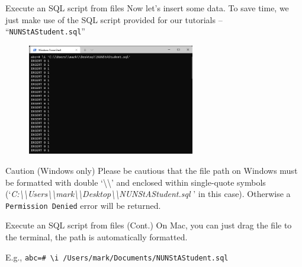 \begin{frame}[fragile]{Execute an SQL script from files}
	Now let's insert some data. To save time, we just make use of the SQL script provided for our tutorials -- ``\texttt{NUNStAStudent.sql}''
	
	\begin{figure}
		\includegraphics[trim=0 5cm 0 0, clip, width=0.65\textwidth]{t0-psql/images/7.png}
	\end{figure}
	
	\begin{alertblock}{Caution (Windows only)}
		Please be cautious that the file path on Windows must be formatted with double `\textbackslash\textbackslash' and enclosed within single-quote symbols (`\textit{C:\textbackslash\textbackslash Users\textbackslash\textbackslash mark\textbackslash\textbackslash Desktop\textbackslash\textbackslash NUNStAStudent.sql }' in this case). Otherwise a \texttt{Permission Denied} error will be returned.
	\end{alertblock}
	
\end{frame}

\begin{frame}[fragile]{Execute an SQL script from files (Cont.)}
	On Mac, you can just drag the file to the terminal, the path is automatically formatted.\vspace{20pt}
	
	E.g., \texttt{abc=\# \textbackslash i /Users/mark/Documents/NUNStAStudent.sql}
	
\end{frame}


